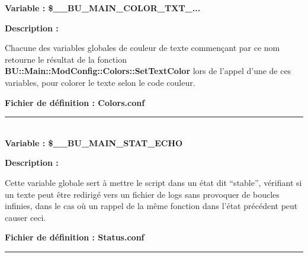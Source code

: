 \documentclass[a4paper,10pt]{article}
\begin{document}
\textbf{Variable : \color{vars}\$\_\_BU\_MAIN\_COLOR\_TXT\_...}\\[1\baselineskip]

\setlength{\parskip}{2em}

\begin{justify}
    \textbf{Description :}
\end{justify}

\setlength{\parskip}{1em}

\begin{justify}
    Chacune des variables globales de couleur de texte commençant par ce nom retourne le résultat de la fonction \textbf{\color{func}BU::Main::ModConfig::Colors::SetTextColor} lors de l'appel d'une de ces variables, pour colorer le texte selon le code couleur.
\end{justify}

\textbf{Fichier de définition : \color{path}Colors.conf}\\[1\baselineskip]



\color{vars}\par\noindent\rule{\textwidth}{0.4pt}\color{text}\\[1\baselineskip]

\textbf{Variable : \color{vars}\$\_\_BU\_MAIN\_STAT\_ECHO}\\[1\baselineskip]

\setlength{\parskip}{2em}

\begin{justify}
    \textbf{Description :}
\end{justify}

\setlength{\parskip}{1em}

\begin{justify}
    Cette variable globale sert à mettre le script dans un état dit ``stable'', vérifiant si un texte peut être redirigé vers un fichier de logs sans provoquer de boucles infinies, dans le cas où un rappel de la même fonction dans l'état précédent peut causer ceci.
\end{justify}

\textbf{Fichier de définition : \color{path}Status.conf}\\[1\baselineskip]



\color{vars}\par\noindent\rule{\textwidth}{0.4pt}\color{text}\\[1\baselineskip]
\end{document}

